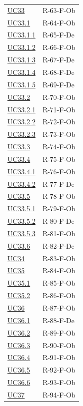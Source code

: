 \documentclass[a4paper, 11pt]{article}
\begin{document}
\begin{longtable}[c]{ >{\centering\arraybackslash}m{2.5cm} >{\centering\arraybackslash}m{10cm} }
    \hyperref[UC33]{UC33} & R-63-F-Ob \\
    \hyperref[UC33.1]{UC33.1} & R-64-F-Ob \\
    \hyperref[UC33.1.1]{UC33.1.1} & R-65-F-De \\
    \hyperref[UC33.1.2]{UC33.1.2} & R-66-F-Ob \\
    \hyperref[UC33.1.3]{UC33.1.3} & R-67-F-De \\
    \hyperref[UC33.1.4]{UC33.1.4} & R-68-F-De \\
    \hyperref[UC33.1.5]{UC33.1.5} & R-69-F-De \\
    \hyperref[UC33.2]{UC33.2} & R-70-F-Ob \\
    \hyperref[UC33.2.1]{UC33.2.1} & R-71-F-Ob \\
    \hyperref[UC33.2.2]{UC33.2.2} & R-72-F-Ob \\
    \hyperref[UC33.2.3]{UC33.2.3} & R-73-F-Ob \\
    \hyperref[UC33.3]{UC33.3} & R-74-F-Ob \\
    \hyperref[UC33.4]{UC33.4} & R-75-F-Ob \\
    \hyperref[UC33.4.1]{UC33.4.1} & R-76-F-Ob \\
    \hyperref[UC33.4.2]{UC33.4.2} & R-77-F-De \\
    \hyperref[UC33.5]{UC33.5} & R-78-F-Ob \\
    \hyperref[UC33.5.1]{UC33.5.1} & R-79-F-Ob \\
    \hyperref[UC33.5.2]{UC33.5.2} & R-80-F-De \\
    \hyperref[UC33.5.3]{UC33.5.3} & R-81-F-Ob \\
    \hyperref[UC33.6]{UC33.6} & R-82-F-De \\
    \hyperref[UC34]{UC34} & R-83-F-Ob \\
    \hyperref[UC35]{UC35} & R-84-F-Ob \\
    \hyperref[UC35.1]{UC35.1} & R-85-F-Ob \\
    \hyperref[UC35.2]{UC35.2} & R-86-F-Ob \\
    \hyperref[UC36]{UC36} & R-87-F-Ob \\
    \hyperref[UC36.1]{UC36.1} & R-88-F-De \\
    \hyperref[UC36.2]{UC36.2} & R-89-F-Ob \\
    \hyperref[UC36.3]{UC36.3} & R-90-F-Ob \\
    \hyperref[UC36.4]{UC36.4} & R-91-F-Ob \\
    \hyperref[UC36.5]{UC36.5} & R-92-F-Ob \\
    \hyperref[UC36.6]{UC36.6} & R-93-F-Ob \\
    \hyperref[UC37]{UC37} & R-94-F-Ob \\
\end{longtable}
\end{document}
